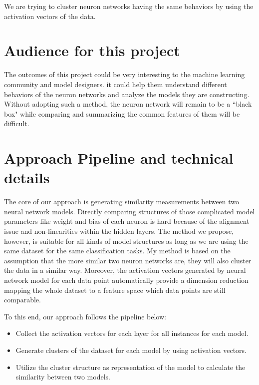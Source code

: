 \documentclass[11pt, twocolumn]{article}
\begin{document}
We are trying to cluster neuron networks having the same behaviors by using the activation vectors of the data.

\section{Audience for this project}

The outcomes of this project could be very interesting to the machine learning community and model designers. it could help them understand different behaviors of the neuron networks and analyze the models they are constructing. Without adopting such a method, the neuron network will remain to be a ``black box"  while comparing and summarizing the common features of them will be difficult.

\section{Approach Pipeline and technical details}

The core of our approach is generating similarity measurements between two neural network models. Directly comparing structures of those complicated model parameters like weight  and bias of each neuron is hard because of the alignment issue and non-linearities within the hidden layers. The method we propose, however, is suitable for all kinds of model structures as long as we are using the same dataset for the same classification tasks. My method is based on the assumption that the more similar two neuron networks are, they will also cluster the data in a similar way.  Moreover, the activation vectors generated by neural network model for each data point automatically provide a dimension reduction mapping the whole dataset to a feature space which data points are still comparable.

To this end, our approach follows the pipeline below:
\begin{itemize}
	\item Collect the activation vectors for each layer for all instances for each model.
	\item Generate clusters of the dataset for each model by using activation vectors. 
	\item Utilize the cluster structure as representation of the model to calculate the similarity between two models.
\end{itemize}
\end{document}
